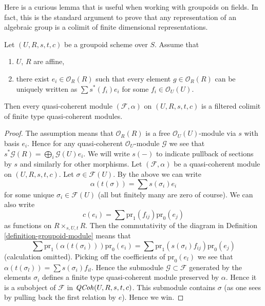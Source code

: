 \noindent
Here is a curious lemma that is useful when working with groupoids
on fields. In fact, this is the standard argument to prove that any
representation of an algebraic group is a colimit of finite dimensional
representations.

\begin{lemma}
\label{lemma-colimit-finite-type}
Let $(U, R, s, t, c)$ be a groupoid scheme over $S$.
Assume that
\begin{enumerate}
\item $U$, $R$ are affine,
\item there exist $e_i \in \mathcal{O}_R(R)$ such that
every element $g \in \mathcal{O}_R(R)$ can be uniquely written as
$\sum s^*(f_i)e_i$ for some $f_i \in \mathcal{O}_U(U)$.
\end{enumerate}
Then every quasi-coherent module $(\mathcal{F}, \alpha)$ on $(U, R, s, t, c)$
is a filtered colimit of finite type quasi-coherent modules.
\end{lemma}

\begin{proof}
The assumption means that $\mathcal{O}_R(R)$ is a free
$\mathcal{O}_U(U)$-module via $s$ with basis $e_i$. Hence
for any quasi-coherent $\mathcal{O}_U$-module $\mathcal{G}$
we see that $s^*\mathcal{G}(R) = \bigoplus_i \mathcal{G}(U)e_i$.
We will write $s(-)$ to indicate pullback of sections by $s$ and
similarly for other morphisms.
Let $(\mathcal{F}, \alpha)$ be a quasi-coherent module on
$(U, R, s, t, c)$. Let $\sigma \in \mathcal{F}(U)$. By the above
we can write
$$
\alpha(t(\sigma)) = \sum s(\sigma_i) e_i
$$
for some unique $\sigma_i \in \mathcal{F}(U)$ (all but finitely many
are zero of course). We can also write
$$
c(e_i) = \sum \text{pr}_1(f_{ij}) \text{pr}_0(e_j)
$$
as functions on $R \times_{s, U, t}R$. Then the commutativity of the diagram
in Definition \ref{definition-groupoid-module} means that
$$
\sum \text{pr}_1(\alpha(t(\sigma_i))) \text{pr}_0(e_i)
=
\sum \text{pr}_1(s(\sigma_i)f_{ij}) \text{pr}_0(e_j)
$$
(calculation omitted). Picking off the coefficients of $\text{pr}_0(e_l)$
we see that $\alpha(t(\sigma_l)) = \sum s(\sigma_i)f_{il}$. Hence
the submodule $\mathcal{G} \subset \mathcal{F}$ generated by the
elements $\sigma_i$ defines a finite type quasi-coherent module
preserved by $\alpha$. Hence it is a subobject of $\mathcal{F}$ in
$\mathit{QCoh}(U, R, s, t, c)$. This submodule contains $\sigma$
(as one sees by pulling back the first relation by $e$). Hence we win.
\end{proof}

